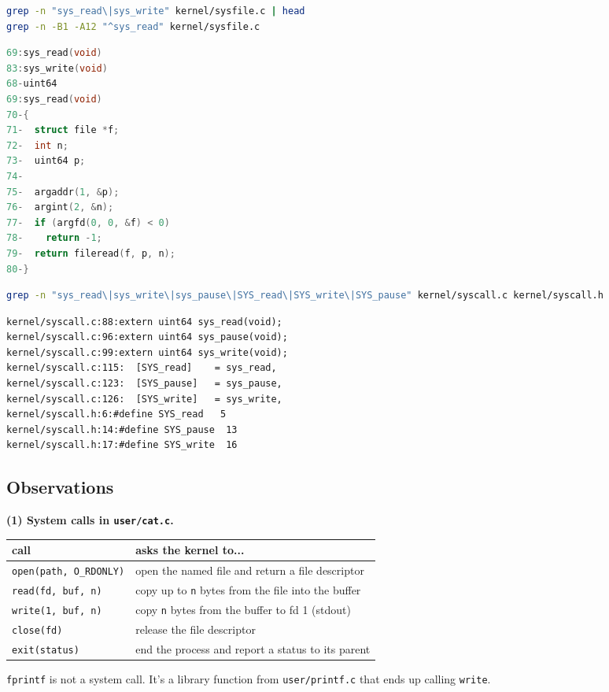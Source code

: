 \documentclass[12pt]{article}
\begin{document}
\begin{lstlisting}[language=bash]
grep -n "sys_read\|sys_write" kernel/sysfile.c | head
grep -n -B1 -A12 "^sys_read" kernel/sysfile.c
\end{lstlisting}
\begin{lstlisting}[language=C]
69:sys_read(void)
83:sys_write(void)
68-uint64
69:sys_read(void)
70-{
71-  struct file *f;
72-  int n;
73-  uint64 p;
74-
75-  argaddr(1, &p);
76-  argint(2, &n);
77-  if (argfd(0, 0, &f) < 0)
78-    return -1;
79-  return fileread(f, p, n);
80-}
\end{lstlisting}

\begin{lstlisting}[language=bash]
grep -n "sys_read\|sys_write\|sys_pause\|SYS_read\|SYS_write\|SYS_pause" kernel/syscall.c kernel/syscall.h
\end{lstlisting}
\begin{lstlisting}
kernel/syscall.c:88:extern uint64 sys_read(void);
kernel/syscall.c:96:extern uint64 sys_pause(void);
kernel/syscall.c:99:extern uint64 sys_write(void);
kernel/syscall.c:115:  [SYS_read]    = sys_read,
kernel/syscall.c:123:  [SYS_pause]   = sys_pause,
kernel/syscall.c:126:  [SYS_write]   = sys_write,
kernel/syscall.h:6:#define SYS_read   5
kernel/syscall.h:14:#define SYS_pause  13
kernel/syscall.h:17:#define SYS_write  16
\end{lstlisting}

\subsection*{Observations}
\textbf{(1) System calls in \texttt{user/cat.c}.}
\begin{center}
\begin{tabular}{ll}
\hline
\textbf{call} & \textbf{asks the kernel to...} \\
\hline
\texttt{open(path, O\_RDONLY)} & open the named file and return a file descriptor \\
\texttt{read(fd, buf, n)} & copy up to \texttt{n} bytes from the file into the buffer \\
\texttt{write(1, buf, n)} & copy \texttt{n} bytes from the buffer to fd 1 (stdout) \\
\texttt{close(fd)} & release the file descriptor \\
\texttt{exit(status)} & end the process and report a status to its parent \\
\hline
\end{tabular}
\end{center}
\texttt{fprintf} is not a system call. It's a library function from \texttt{user/printf.c} that ends up calling \texttt{write}.
\end{document}
